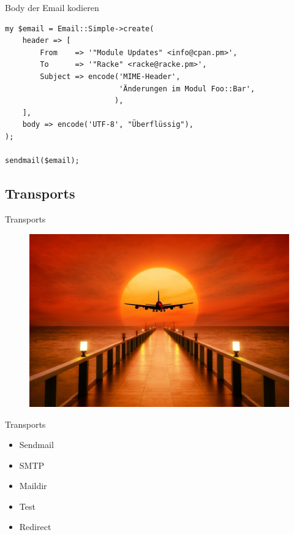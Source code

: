 \begin{frame}[fragile]{Body der Email kodieren}
  \begin{lstlisting}
my $email = Email::Simple->create(
    header => [
        From    => '"Module Updates" <info@cpan.pm>',
        To      => '"Racke" <racke@racke.pm>',
        Subject => encode('MIME-Header',
                          'Änderungen im Modul Foo::Bar',
                         ),
    ],
    body => encode('UTF-8', "Überflüssig"),
);

sendmail($email);
  \end{lstlisting}
\end{frame}

\subsection{Transports}

\begin{frame}{Transports}
  \begin{figure}[!ht]
    \centering
    \includegraphics[width=0.9\linewidth]{img/sunset-3193002_1920.jpg}
  \end{figure}
\end{frame}

\begin{frame}{Transports}
  \begin{itemize}
    \item Sendmail
    \item SMTP
    \item Maildir
    \item Test
    \item Redirect
  \end{itemize}
\end{frame}

